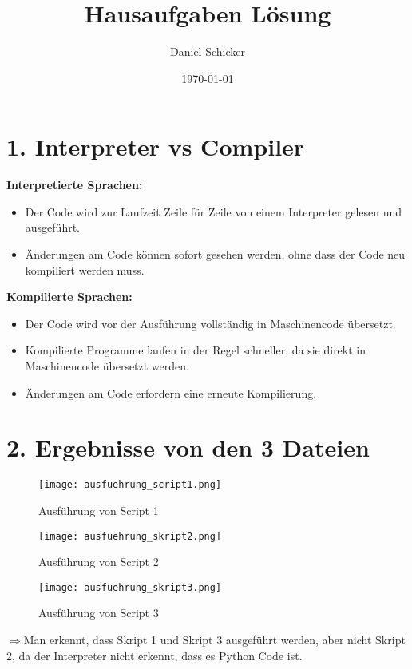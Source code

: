 \documentclass{article}
\begin{document}
\title{Hausaufgaben Lösung}
\author{Daniel Schicker}
\date{\today}

\maketitle

\section*{1. Interpreter vs Compiler}
\textbf{Interpretierte Sprachen:}
\begin{itemize}
    \item Der Code wird zur Laufzeit Zeile für Zeile von einem Interpreter gelesen und ausgeführt.
    \item Änderungen am Code können sofort gesehen werden, ohne dass der Code neu kompiliert werden muss.
\end{itemize}

\textbf{Kompilierte Sprachen:}
\begin{itemize}
    \item Der Code wird vor der Ausführung vollständig in Maschinencode übersetzt.
    \item Kompilierte Programme laufen in der Regel schneller, da sie direkt in Maschinencode übersetzt werden.
    \item Änderungen am Code erfordern eine erneute Kompilierung.
\end{itemize}

\section*{2. Ergebnisse von den 3 Dateien}
\begin{figure}[h]
    \raggedright\caption{Ausführung von Script 1}%
    \texttt{[image: ausfuehrung\_script1.png]}
\end{figure}

\begin{figure}[h]
    \raggedright\caption{Ausführung von Script 2}
    \texttt{[image: ausfuehrung\_skript2.png]}
\end{figure}

\begin{figure}[h]
    \raggedright\caption{Ausführung von Script 3}
    \texttt{[image: ausfuehrung\_skript3.png]}
\end{figure}

$\Rightarrow$Man erkennt, dass Skript 1 und Skript 3 ausgeführt werden, aber nicht Skript 2, da der Interpreter
\hspace*{2.5em}nicht erkennt, dass es Python Code ist.
\\\\\\\\\\\\\\\\\\\\
\end{document}

